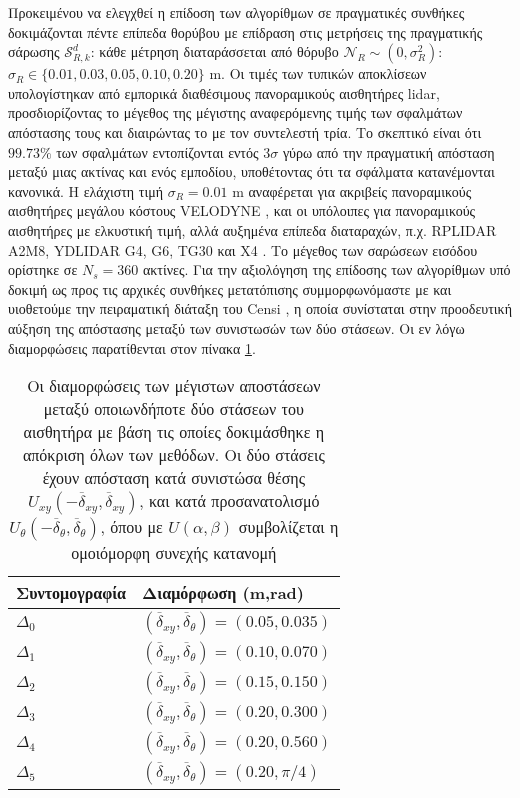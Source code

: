 Προκειμένου να ελεγχθεί η επίδοση των αλγορίθμων σε πραγματικές συνθήκες
δοκιμάζονται πέντε επίπεδα θορύβου με επίδραση στις μετρήσεις της πραγματικής
σάρωσης $\mathcal{S}_{R,k}^d$: κάθε μέτρηση διαταράσσεται από θόρυβο
$\mathcal{N}_{R} \sim (0, \sigma_{R}^2)$: $\sigma_R \in \{0.01, 0.03, 0.05,
0.10, 0.20\}$ m. Οι τιμές των τυπικών αποκλίσεων υπολογίστηκαν από εμπορικά
διαθέσιμους πανοραμικούς αισθητήρες lidar, προσδιορίζοντας το μέγεθος της
μέγιστης αναφερόμενης τιμής των σφαλμάτων απόστασης τους και διαιρώντας το με
τον συντελεστή τρία. Το σκεπτικό είναι ότι $99.73\%$ των σφαλμάτων εντοπίζονται
εντός $3\sigma$ γύρω από την πραγματική απόσταση μεταξύ μιας ακτίνας και ενός
εμποδίου, υποθέτοντας ότι τα σφάλματα κατανέμονται κανονικά. Η ελάχιστη τιμή
$\sigma_R = 0.01$ m αναφέρεται για ακριβείς πανοραμικούς αισθητήρες μεγάλου
κόστους VELODYNE \cite{velodyne_datasheet}, και οι υπόλοιπες για πανοραμικούς
αισθητήρες με ελκυστική τιμή, αλλά αυξημένα επίπεδα διαταραχών, π.χ. RPLIDAR
A2M8, YDLIDAR G4, G6, TG30 και X4 \cite{a2m8_datasheet,ydlidar}. Το μέγεθος
των σαρώσεων εισόδου ορίστηκε σε $N_s=360$ ακτίνες. Για την αξιολόγηση της
επίδοσης των αλγορίθμων υπό δοκιμή ως προς τις αρχικές συνθήκες μετατόπισης
συμμορφωνόμαστε με και υιοθετούμε την πειραματική διάταξη του Censi
\cite{Censi2008a}, η οποία συνίσταται στην προοδευτική αύξηση της απόστασης
μεταξύ των συνιστωσών των δύο στάσεων. Οι εν λόγω διαμορφώσεις παρατίθενται
στον πίνακα \ref{tbl:02:05_03:deltas}.

\begin{table}\centering
  \begin{tabular}{ll}
  Συντομογραφία         & Διαμόρφωση (m,rad)                                                      \\  \toprule
  $\Delta_0$            & $(\overline{\delta}_{xy}, \overline{\delta}_{\theta}) = (0.05, 0.035)$  \\
  $\Delta_1$            & $(\overline{\delta}_{xy}, \overline{\delta}_{\theta}) = (0.10, 0.070)$  \\
  $\Delta_2$            & $(\overline{\delta}_{xy}, \overline{\delta}_{\theta}) = (0.15, 0.150)$  \\
  $\Delta_3$            & $(\overline{\delta}_{xy}, \overline{\delta}_{\theta}) = (0.20, 0.300)$  \\
  $\Delta_4$            & $(\overline{\delta}_{xy}, \overline{\delta}_{\theta}) = (0.20, 0.560)$  \\
  $\Delta_5$            & $(\overline{\delta}_{xy}, \overline{\delta}_{\theta}) = (0.20, \pi/4)$  \\  \bottomrule
  \end{tabular}
\caption{\small Οι διαμορφώσεις των μέγιστων αποστάσεων μεταξύ οποιωνδήποτε δύο
         στάσεων του αισθητήρα με βάση τις οποίες δοκιμάσθηκε η απόκριση όλων
         των μεθόδων. Οι δύο στάσεις έχουν απόσταση κατά συνιστώσα θέσης
         $U_{xy}(-\overline{\delta}_{xy}, \overline{\delta}_{xy})$, και
         κατά προσανατολισμό
         $U_{\theta}(-\overline{\delta}_{\theta}, \overline{\delta}_{\theta})$,
         όπου με $U(\alpha,\beta)$ συμβολίζεται η ομοιόμορφη συνεχής κατανομή}
  \label{tbl:02:05_03:deltas}
\end{table}

